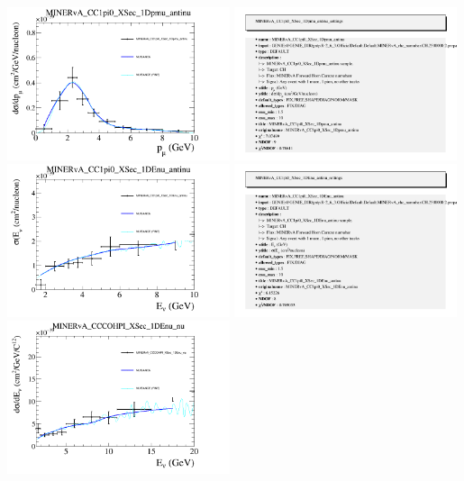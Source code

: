 \documentclass{article}
\begin{document}
\centering
\includegraphics[width=0.49\textwidth]{figures/nuisance_MINERvA_CC1pi0_XSec_1Dpmu_antinu_comp.png}
\includegraphics[width=0.49\textwidth]{figures/nuisance_MINERvA_CC1pi0_XSec_1Dpmu_antinu_info.png}
\centering
\includegraphics[width=0.49\textwidth]{figures/nuisance_MINERvA_CC1pi0_XSec_1DEnu_antinu_comp.png}
\includegraphics[width=0.49\textwidth]{figures/nuisance_MINERvA_CC1pi0_XSec_1DEnu_antinu_info.png}
\centering
\includegraphics[width=0.49\textwidth]{figures/nuisance_MINERvA_CCCOHPI_XSec_1DEnu_nu_comp.png}
\end{document}
